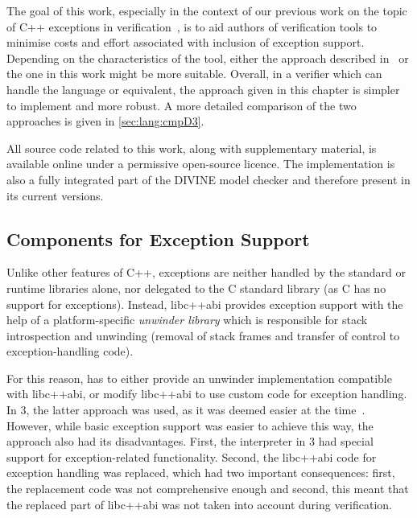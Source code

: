 The goal of this work, especially in the context of our previous work
on the topic of C++ exceptions in
verification~, is to aid authors of
verification tools to minimise costs and effort associated with
inclusion of exception support. Depending on the characteristics of the
tool, either the approach described in~ or
the one in this work might be more suitable. Overall, in a verifier
which can handle the \divm{} language or equivalent, the approach given in
this chapter is simpler to implement and more robust. A more detailed
comparison of the two approaches is given in \autoref{sec:lang:cmpD3}.

All source code related to this work, along with supplementary material, is available online under a permissive open-source licence.
The implementation is also a fully integrated part of the DIVINE model checker
and therefore present in its current versions.

\subsection{Components for Exception Support}

Unlike other features of C++, exceptions are neither handled by the
standard or runtime libraries alone, nor delegated to the C standard
library (as C has no support for exceptions). Instead,
libc++abi provides exception support with the help of a
platform-specific \emph{unwinder library} which is responsible for stack
introspection and unwinding (removal of stack frames and transfer of
control to exception-handling code).

For this reason, \divine{} has to either provide an unwinder implementation
compatible with libc++abi, or modify libc++abi to use
custom code for exception handling. In \divine{} 3, the latter approach was
used, as it was deemed easier at the
time~. However, while basic exception
support was easier to achieve this way, the approach also had its
disadvantages. First, the \llvm{} interpreter in \divine{} 3 had special
support for exception-related functionality. Second, the
libc++abi code for exception handling was replaced, which had two
important consequences: first, the replacement code was not
comprehensive enough
and second, this meant that the replaced part of libc++abi was
not taken into account during verification.

